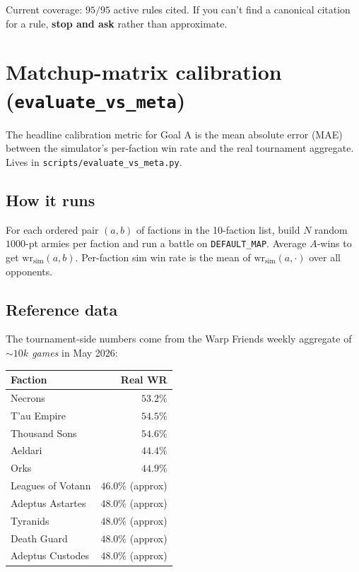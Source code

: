 \documentclass[11pt,a4paper]{article}
\begin{document}
Current coverage: $95/95$ active rules cited. If you can't find a
canonical citation for a rule, \textbf{stop and ask} rather than
approximate.

\section{Matchup-matrix calibration (\texttt{evaluate\_vs\_meta})}
\label{sec:evaluate-vs-meta}

The headline calibration metric for Goal A is the mean absolute error
(MAE) between the simulator's per-faction win rate and the real
tournament aggregate. Lives in \texttt{scripts/evaluate\_vs\_meta.py}.

\subsection{How it runs}
For each ordered pair $(a, b)$ of factions in the 10-faction list, build
$N$ random $1000$-pt armies per faction and run a battle on
\texttt{DEFAULT\_MAP}. Average $A$-wins to get $\mathrm{wr}_{\text{sim}}(a, b)$.
Per-faction sim win rate is the mean of $\mathrm{wr}_{\text{sim}}(a, \cdot)$
over all opponents.

\subsection{Reference data}
The tournament-side numbers come from the Warp Friends weekly aggregate
of \emph{${\sim}10k$ games} in May 2026:

\begin{tabular}{lr}
\toprule
Faction & Real WR \\
\midrule
Necrons          & $53.2\%$ \\
T'au Empire      & $54.5\%$ \\
Thousand Sons    & $54.6\%$ \\
Aeldari          & $44.4\%$ \\
Orks             & $44.9\%$ \\
Leagues of Votann & $46.0\%$ (approx) \\
Adeptus Astartes & $48.0\%$ (approx) \\
Tyranids         & $48.0\%$ (approx) \\
Death Guard      & $48.0\%$ (approx) \\
Adeptus Custodes & $48.0\%$ (approx) \\
\bottomrule
\end{tabular}
\end{document}
